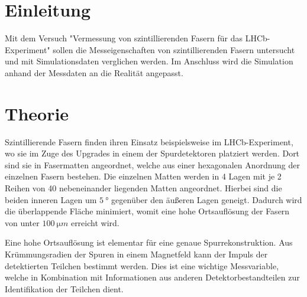 \section{Einleitung}
Mit dem Versuch "Vermessung von szintillierenden Fasern für das LHCb-Experiment" sollen die Messeigenschaften von szintillierenden Fasern untersucht und mit Simulationsdaten verglichen werden. Im Anschluss wird die Simulation anhand der Messdaten an die Realität angepasst.

\section{Theorie}
Szintillierende Fasern finden ihren Einsatz beispielsweise im LHCb-Experiment, wo sie im Zuge des Upgrades in einem der Spurdetektoren platziert werden.
Dort sind sie in Fasermatten angeordnet, welche aus einer hexagonalen Anordnung der einzelnen Fasern bestehen. Die einzelnen Matten werden in 4 Lagen mit je 2 Reihen von 40 nebeneinander liegenden Matten angeordnet. Hierbei sind die beiden inneren Lagen um $\SI{5}{°}$ gegenüber den äußeren Lagen geneigt. Dadurch wird die überlappende Fläche minimiert, womit eine hohe Ortsauflösung der Fasern von unter $\SI{100}{\micro m}$ erreicht wird. 

Eine hohe Ortsauflösung ist elementar für eine genaue Spurrekonstruktion. Aus Krümmungsradien der Spuren in einem Magnetfeld kann der Impuls der detektierten Teilchen bestimmt werden. Dies ist eine wichtige Messvariable, welche in Kombination mit Informationen aus anderen Detektorbestandteilen zur Identifikation der Teilchen dient. 

